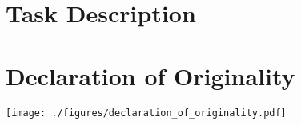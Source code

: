 
\chapter{Task Description}
%



\chapter{Declaration of Originality}\label{chap:originality}

\texttt{[image: ./figures/declaration\_of\_originality.pdf]}


